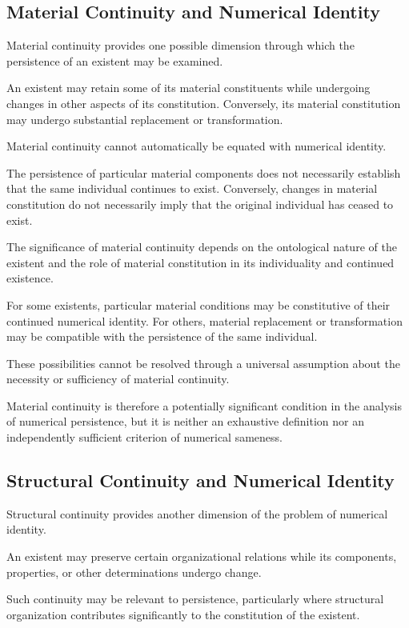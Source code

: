 \subsection{Material Continuity and Numerical Identity}

Material continuity provides one possible
dimension through which the persistence
of an existent may be examined.

An existent may retain some of its material
constituents while undergoing changes
in other aspects of its constitution.
Conversely, its material constitution
may undergo substantial replacement
or transformation.

Material continuity cannot automatically
be equated with numerical identity.

The persistence of particular material
components does not necessarily establish
that the same individual continues to
exist. Conversely, changes in material
constitution do not necessarily imply
that the original individual has ceased
to exist.

The significance of material continuity
depends on the ontological nature of
the existent and the role of material
constitution in its individuality and
continued existence.

For some existents, particular material
conditions may be constitutive of their
continued numerical identity. For others,
material replacement or transformation
may be compatible with the persistence
of the same individual.

These possibilities cannot be resolved
through a universal assumption about
the necessity or sufficiency of material
continuity.

Material continuity is therefore a
potentially significant condition in
the analysis of numerical persistence,
but it is neither an exhaustive definition
nor an independently sufficient criterion
of numerical sameness.

\subsection{Structural Continuity and Numerical Identity}

Structural continuity provides another
dimension of the problem of numerical
identity.

An existent may preserve certain
organizational relations while its
components, properties, or other
determinations undergo change.

Such continuity may be relevant to
persistence, particularly where structural
organization contributes significantly
to the constitution of the existent.

